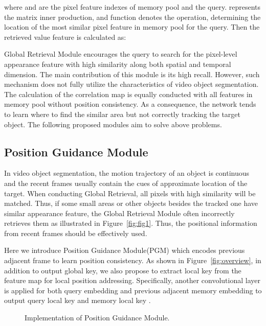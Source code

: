 \documentclass[final]{cvpr}
\begin{document}
where  and  are the pixel feature indexes of memory pool and the query.  represents the matrix inner production, and function  denotes the  operation, determining the location of the most similar pixel feature in memory pool for the query. Then the retrieved value feature is calculated as:


Global Retrieval Module encourages the query to search for the pixel-level appearance feature with high similarity along both spatial and temporal dimension. The main contribution of this module is its high recall. However, such mechanism does not fully utilize the characteristics of video object segmentation. The calculation of the correlation map is equally conducted with all features in memory pool without position consistency. As a consequence, the network tends to learn where to find the similar area but not correctly tracking the target object. The following proposed modules aim to solve above problems.


\subsection{Position Guidance Module}\label{sec:PGM}
In video object segmentation, the motion trajectory of an object is continuous and the recent frames usually contain the cues of approximate location of the target. When conducting Global Retrieval, all pixels with high similarity will be matched. Thus, if some small areas or other objects besides the tracked one have similar appearance feature, the Global Retrieval Module often incorrectly retrieves them as illustrated in Figure~\ref{fig:fig1}. Thus, the positional information from recent frames should be effectively used.

Here we introduce Position Guidance Module(PGM) which encodes previous adjacent frame to learn position consistency. As shown in Figure~\ref{fig:overview}, in addition to output global key, we also propose to extract local key from the  feature map for local position addressing. Specifically, another  convolutional layer is applied for both query embedding and previous adjacent memory embedding to output query local key  and memory local key . 
\begin{figure}[!t]
\begin{center}
	\setlength{\fboxrule}{0pt}
\end{center}
\caption{Implementation of Position Guidance Module.}
\label{fig:pos}
\end{figure}
\end{document}
